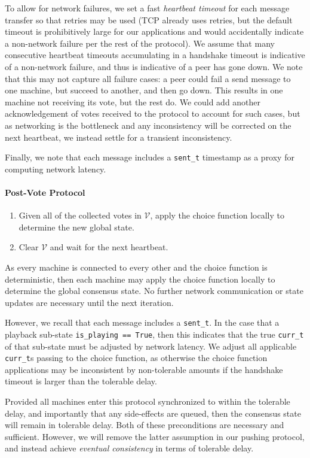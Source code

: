 \documentclass[%
               nonacm,sigconf,10pt]{acmart}
\newcommand{\py}[1]{\texttt{#1}}
\begin{document}
To allow for network failures, we set a fast {\it heartbeat timeout} for each message transfer so that retries may be used (TCP already uses retries, but the default timeout is prohibitively large for our applications and would accidentally indicate a non-network failure per the rest of the protocol). We assume that many consecutive heartbeat timeouts accumulating in a handshake timeout is indicative of a non-network failure, and thus is indicative of a peer has gone down. We note that this may not capture all failure cases: a peer could fail a send message to one machine, but succeed to another, and then go down. This results in one machine not receiving its vote, but the rest do. We could add another acknowledgement of votes received to the protocol to account for such cases, but as networking is the bottleneck and any inconsistency will be corrected on the next heartbeat, we instead settle for a transient inconsistency.

Finally, we note that each message includes a \py{sent_t} timestamp as a proxy for computing network latency.

\paragraph{Post-Vote Protocol}

\begin{enumerate}
    \item Given all of the collected votes in $\mathcal{V}$, apply the choice function locally to determine the new global state.
    \item Clear $\mathcal{V}$ and wait for the next heartbeat.
\end{enumerate}

As every machine is connected to every other and the choice function is deterministic, then each machine may apply the choice function locally to determine the global consensus state. No further network communication or state updates are necessary until the next iteration.

However, we recall that each message includes a \py{sent_t}. In the case that a playback sub-state \py{is_playing == True}, then this indicates that the true \py{curr_t} of that sub-state must be adjusted by network latency. We adjust all applicable \py{curr_t}s passing to the choice function, as otherwise the choice function applications may be inconsistent by non-tolerable amounts if the handshake timeout is larger than the tolerable delay.

Provided all machines enter this protocol synchronized to within the tolerable delay, and importantly that any side-effects are queued, then the consensus state will remain in tolerable delay. Both of these preconditions are necessary and sufficient. However, we will remove the latter assumption in our pushing protocol, and instead achieve {\it eventual consistency} in terms of tolerable delay.
\end{document}
